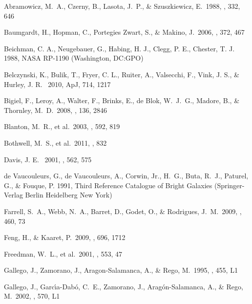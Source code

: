 \documentclass{article}
\begin{document}
%
\begin{thebibliography}{47}

 Abramowicz, M.~A., Czerny, B., Lasota, J.~P., \& Szuszkiewicz, E.\ 1988, \apj, 332, 646 

 Baumgardt, H., Hopman, C., Portegies Zwart, S., \& Makino, J.\ 2006, \mnras, 372, 467 

 Beichman, C. A., Neugebauer, G., Habing, H. J., Clegg, P. E., Chester, T. J. 1988,
     NASA RP-1190 (Washington, DC:GPO)

\bibitem[]{}
 Belczynski, K., Bulik, T., Fryer, C. L., Ruiter, A., Valsecchi, F., 
  Vink, J. S., \& Hurley, J. R. \ 2010, ApJ, 714, 1217

 Bigiel, F., Leroy, A., Walter, F., Brinks, E., de Blok, W.~J.~G., Madore, B., 
  \& Thornley, M.~D.\ 2008, \aj, 136, 2846 

 Blanton, M.~R., et al.\ 2003, \apj, 592, 819 

 Bothwell, M.~S., et al.\ 2011, \mnras, 832 

\bibitem[Davis 2001]{}
 Davis, J. E. \ 2001, \apj, 562, 575

{de Vaucouleurs}, G., {de Vaucouleurs}, A., {Corwin}, Jr., H.~G., {Buta},
  R.~J., {Paturel}, G., \& {Fouque}, P. 1991, {Third Reference Catalogue of
  Bright Galaxies} (Springer-Verlag Berlin Heidelberg New York)

 Farrell, S.~A., Webb, N.~A., Barret, D., Godet, O., \& Rodrigues, J.~M.\ 2009, \nat, 460, 73 

 Feng, H., \& Kaaret, P.\ 2009, \apj, 696, 1712 

 Freedman, W.~L., et al.\ 2001, \apj, 553, 47 

 Gallego, J., Zamorano, J., Aragon-Salamanca, A., \& Rego, M.\ 1995, \apjl, 455, L1 

 Gallego, J., Garc{\'{\i}}a-Dab{\'o}, C.~E., Zamorano, J., Arag{\'o}n-Salamanca, A., 
  \& Rego, M.\ 2002, \apjl, 570, L1 


\end{thebibliography}
\end{document}
